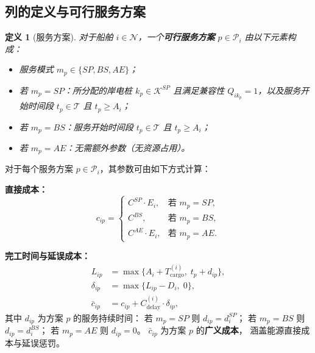 \documentclass[UTF8, a4paper, 12pt]{ctexart}
\newtheorem{definition}{定义}
\begin{document}
\subsection{列的定义与可行服务方案}
\label{sec:cg_column}

\begin{definition}[服务方案]
对于船舶 $i \in \mathcal{N}$，一个\textbf{可行服务方案} $p \in \mathcal{P}_i$
由以下元素构成：
\begin{itemize}
  \item 服务模式 $m_p \in \{SP, BS, AE\}$；
  \item 若 $m_p = SP$：所分配的岸电桩 $k_p \in \mathcal{K}^{SP}$
        且满足兼容性 $Q_{ik_p} = 1$，以及服务开始时间段 $t_p \in \mathcal{T}$
        且 $t_p \ge A_i$；
  \item 若 $m_p = BS$：服务开始时间段 $t_p \in \mathcal{T}$
        且 $t_p \ge A_i$；
  \item 若 $m_p = AE$：无需额外参数（无资源占用）。
\end{itemize}
\end{definition}

\noindent
对于每个服务方案 $p \in \mathcal{P}_i$，其参数可由如下方式计算：

\medskip
\noindent\textbf{直接成本：}
\begin{equation}
  c_{ip} =
  \begin{cases}
    C^{SP} \cdot E_i, & \text{若 } m_p = SP, \\
    C^{BS}, & \text{若 } m_p = BS, \\
    C^{AE} \cdot E_i, & \text{若 } m_p = AE.
  \end{cases}
  \label{eq:col_cost}
\end{equation}

\noindent\textbf{完工时间与延误成本：}
\begin{align}
  L_{ip} &= \max\!\Big\{A_i + T_{\text{cargo}}^{(i)},\;
    t_p + d_{ip}\Big\},
  \label{eq:col_finish} \\
  \delta_{ip} &= \max\!\big\{L_{ip} - D_i,\; 0\big\},
  \label{eq:col_delay} \\
  \bar{c}_{ip} &= c_{ip} + C_{\text{delay}}^{(i)} \cdot \delta_{ip},
  \label{eq:col_gencost}
\end{align}
其中 $d_{ip}$ 为方案 $p$ 的服务持续时间：
若 $m_p = SP$ 则 $d_{ip} = d_i^{SP}$；
若 $m_p = BS$ 则 $d_{ip} = d_i^{BS}$；
若 $m_p = AE$ 则 $d_{ip} = 0$。
$\bar{c}_{ip}$ 为方案 $p$ 的\textbf{广义成本}，
涵盖能源直接成本与延误惩罚。
\end{document}
